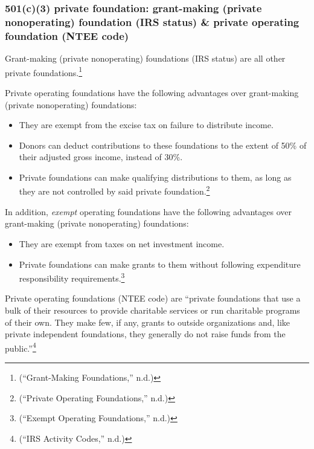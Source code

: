 \documentclass[
  letterpaper,
  DIV=11,
  numbers=noendperiod]{scrreprt}
\providecommand{\tightlist}{%
  \setlength{\itemsep}{0pt}\setlength{\parskip}{0pt}}\usepackage{longtable,booktabs,array}
\begin{document}
\hypertarget{c3-private-foundation-grant-making-private-nonoperating-foundation-irs-status-private-operating-foundation-ntee-code}{%
\subsubsection{501(c)(3) private foundation: grant-making (private
nonoperating) foundation (IRS status) \& private operating foundation
(NTEE
code)}\label{c3-private-foundation-grant-making-private-nonoperating-foundation-irs-status-private-operating-foundation-ntee-code}}

Grant-making (private nonoperating) foundations (IRS status) are all
other private foundations.\footnote{({``Grant-Making Foundations,''}
  n.d.)}

Private operating foundations have the following advantages over
grant-making (private nonoperating) foundations:

\begin{itemize}
\tightlist
\item
  They are exempt from the excise tax on failure to distribute income.
\item
  Donors can deduct contributions to these foundations to the extent of
  50\% of their adjusted gross income, instead of 30\%.
\item
  Private foundations can make qualifying distributions to them, as long
  as they are not controlled by said private foundation.\footnote{({``Private
    Operating Foundations,''} n.d.)}
\end{itemize}

In addition, \emph{exempt} operating foundations have the following
advantages over grant-making (private nonoperating) foundations:

\begin{itemize}
\tightlist
\item
  They are exempt from taxes on net investment income.
\item
  Private foundations can make grants to them without following
  expenditure responsibility requirements.\footnote{({``Exempt Operating
    Foundations,''} n.d.)}
\end{itemize}

Private operating foundations (NTEE code) are ``private foundations that
use a bulk of their resources to provide charitable services or run
charitable programs of their own. They make few, if any, grants to
outside organizations and, like private independent foundations, they
generally do not raise funds from the public.''\footnote{({``IRS
  Activity Codes,''} n.d.)}
\end{document}

